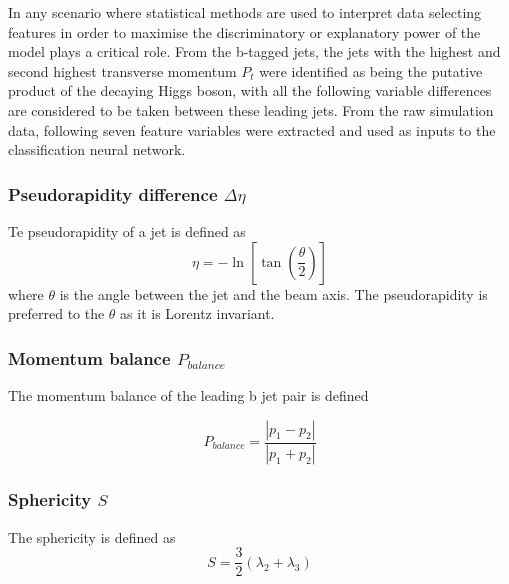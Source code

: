
In any scenario where statistical methods are used to interpret data selecting features in order to maximise the discriminatory or explanatory power of the model plays a critical role.
From the b-tagged jets, the jets with the highest and second highest transverse momentum $P_t$ were identified as being the putative product of the decaying Higgs boson, with all the following variable differences are considered to be taken between these leading jets. 
From the raw simulation data, following \cite{Abazov201197} seven feature variables were extracted and used as inputs to the classification neural network. 

\subsubsection*{Pseudorapidity difference $ \Delta\eta $ } %
\label{ssub:pseudorapidity}

Te pseudorapidity of a jet is defined as
\begin{equation}
	\eta = - \ln\left[\tan\left( \frac{\theta}{2} \right)\right]
\end{equation}
where $\theta$ is the angle between the jet and the beam axis. The pseudorapidity is preferred to the $\theta$ as it is Lorentz invariant.


\subsubsection*{Momentum balance $P_{balance}$} %
\label{ssub:momentum_balance_p__balance}

The momentum balance of the leading b jet pair is defined

\begin{equation}
	P_{balance} = \frac{\left|p_1 - p_2\right|}{ \left|p_1 + p_2\right|}  
\end{equation}


\subsubsection*{Sphericity $S$} %
\label{ssub:sphericity_s}
	The sphericity is defined as 
	\begin{equation}
		S = \frac{3}{2} (\lambda_2 + \lambda_3)
	\end{equation}


